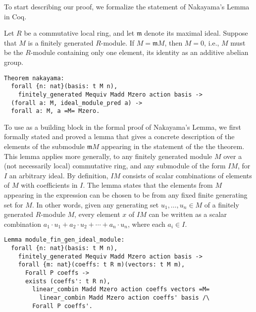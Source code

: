\documentclass{article}
\begin{document}
To start describing our proof, we formalize the statement of Nakayama's Lemma in Coq.

\begin{nak*}
Let $R$ be a commutative local ring, and let $\mathfrak{m}$ denote its maximal
ideal. Suppose that $M$ is a finitely generated $R$-module. If
$M = \mathfrak{m} M$, then $M = 0$, i.e., $M$ must be the $R$-module containing
only one element, its identity as an additive abelian group. 
\end{nak*}

\begin{verbatim}
Theorem nakayama:
  forall {n: nat}(basis: t M n),
    finitely_generated Mequiv Madd Mzero action basis ->
  (forall a: M, ideal_module_pred a) ->
  forall a: M, a =M= Mzero.
\end{verbatim}

To use as a building block in the formal proof of Nakayama's Lemma, we first formally stated and proved a lemma that gives a concrete description of the elements of the submodule $\mathfrak{m} M$  appearing in the statement of the the theorem.  
This lemma applies more generally, to any finitely generated module $M$ over a (not necessarily local) commutative ring, and any submodule of the form $IM$, for $I$ an arbitrary ideal. 
By definition, $IM$ consists of scalar combinations of elements of $M$ with coefficients in $I$. 
The lemma states that the elements from $M$ appearing in the expression can be chosen to be from any 
 fixed finite generating set for $M$. 
In other words, given any generating set  $u_{1},\dots, u_{n} \in M$  of a  finitely generated $R$-module $M$, every element $x$ of $I M$ can be written as a scalar combination $a_1 \cdot u_1 + a_2  \cdot u_2 + \cdots + a_n  \cdot u_n$, where each $a_i \in I$. 

\begin{verbatim}
Lemma module_fin_gen_ideal_module:
  forall {n: nat}(basis: t M n),
    finitely_generated Mequiv Madd Mzero action basis ->
    forall {m: nat}(coeffs: t R m)(vectors: t M m),
      Forall P coeffs ->
      exists (coeffs': t R n),
        linear_combin Madd Mzero action coeffs vectors =M=
          linear_combin Madd Mzero action coeffs' basis /\
        Forall P coeffs'.
\end{verbatim}        
\end{document}
